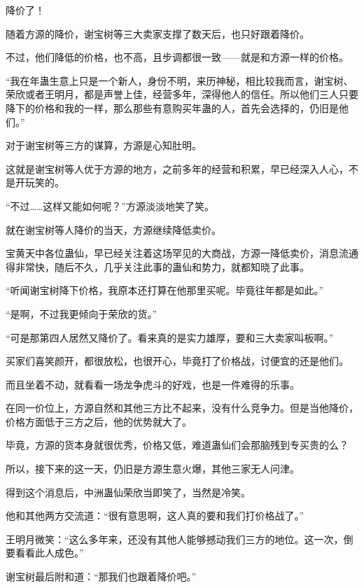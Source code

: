 
\begin{this_body}

降价了！

随着方源的降价，谢宝树等三大卖家支撑了数天后，也只好跟着降价。

不过，他们降低的价格，也不高，且步调都很一致——就是和方源一样的价格。

“我在年蛊生意上只是一个新人，身份不明，来历神秘，相比较我而言，谢宝树、荣欣或者王明月，都是声誉上佳，经营多年，深得他人的信任。所以他们三人只要降下的价格和我的一样，那么那些有意购买年蛊的人，首先会选择的，仍旧是他们。”

对于谢宝树等三方的谋算，方源是心知肚明。

这就是谢宝树等人优于方源的地方，之前多年的经营和积累，早已经深入人心，不是开玩笑的。

“不过……这样又能如何呢？”方源淡淡地笑了笑。

就在谢宝树等人降价的当天，方源继续降低卖价。

宝黄天中各位蛊仙，早已经关注着这场罕见的大商战，方源一降低卖价，消息流通得非常快，随后不久，几乎关注此事的蛊仙和势力，就都知晓了此事。

“听闻谢宝树降下价格，我原本还打算在他那里买呢。毕竟往年都是如此。”

“是啊，不过我更倾向于荣欣的货。”

“可是那第四人居然又降价了。看来真的是实力雄厚，要和三大卖家叫板啊。”

买家们喜笑颜开，都很放松，也很开心，毕竟打了价格战，讨便宜的还是他们。

而且坐着不动，就看看一场龙争虎斗的好戏，也是一件难得的乐事。

在同一价位上，方源自然和其他三方比不起来，没有什么竞争力。但是当他降价，价格方面低于三方之后，他的优势就大了。

毕竟，方源的货本身就很优秀，价格又低，难道蛊仙们会那脑残到专买贵的么？

所以，接下来的这一天，仍旧是方源生意火爆，其他三家无人问津。

得到这个消息后，中洲蛊仙荣欣当即笑了，当然是冷笑。

他和其他两方交流道：“很有意思啊，这人真的要和我们打价格战了。”

王明月微笑：“这么多年来，还没有其他人能够撼动我们三方的地位。这一次，倒要看看此人成色。”

谢宝树最后附和道：“那我们也跟着降价吧。”


\end{this_body}
